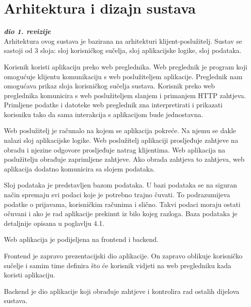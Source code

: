 \chapter{Arhitektura i dizajn sustava}
		
		\textbf{\textit{dio 1. revizije}}\\
		
		
		Arhitektura ovog sustava je bazirana na arhitekturi klijent-poslužitelj. Sustav se sastoji od 3 sloja: sloj korisničkog sučelja, sloj aplikacijske logike, sloj podataka.
		
		Korisnik koristi aplikaciju preko web preglednika. Web preglednik je program koji omogućuje klijentu komunikaciju s web poslužiteljem aplikacije. Preglednik nam omogućava prikaz sloja korisničkog sučelja sustava. Korisnik preko web preglednika komunicira s web poslužiteljem slanjem i primanjem HTTP zahtjeva. Primljene podatke i datoteke web preglednik zna interpretirati i prikazati korisniku tako da sama interakcija s aplikacijom bude jednostavna.
		
		Web poslužitelj je računalo na kojem se aplikacija pokreće. Na njemu se dakle nalazi sloj aplikacijske logike. Web poslužitelj aplikaciji prosljeđuje zahtjeve na obradu i njezine odgovore prosljeđuje natrag klijentima. Web aplikacija na poslužitelju obrađuje zaprimljene zahtjeve. Ako obrada zahtjeva to zahtjeva, web aplikacija dodatno komunicira sa slojem podataka.
		
		Sloj podataka je predstavljen bazom podataka. U bazi podataka se na siguran način spremaju svi podaci koje je potrebno trajno čuvati. To podrazumijeva podatke o prijavama, korisničkim računima i slično. Takvi podaci moraju ostati očuvani i ako je rad aplikacije prekinut iz bilo kojeg razloga. Baza podataka je detaljnije opisana u poglavlju  4.1.
		
		Web aplikacija je podijeljena na frontend i backend.
		
		Frontend je zapravo prezentacijski dio aplikacije. On zapravo oblikuje korisničko sučelje i samim time definira što će korisnik vidjeti na web pregledniku kada koristi aplikaciju.
		
		Backend je dio aplikacije koji obrađuje zahtjeve i kontrolira rad ostalih dijelova sustava.
		
